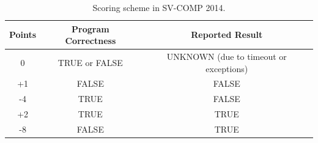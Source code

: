 \begin{table}
\caption{Scoring scheme in SV-COMP 2014.\label{table:scoring-scheme-14}}
\begin{center}
\begin{tabular}{|c|c|c|}
\hline
Points & Program Correctness & Reported Result \\\hline
0      & TRUE or FALSE & UNKNOWN (due to timeout or exceptions) \\
+1     & FALSE         & FALSE \\
-4     & TRUE          & FALSE \\
+2     & TRUE          & TRUE \\
-8     & FALSE         & TRUE \\\hline
\end{tabular}
\end{center}
\end{table}

